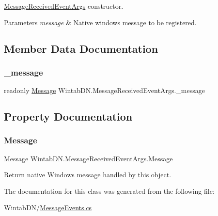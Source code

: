 \mbox{\hyperlink{class_wintab_d_n_1_1_message_received_event_args}{Message\+Received\+Event\+Args}} constructor. 


\begin{DoxyParams}{Parameters}
{\em message} & Native windows message to be registered.\\
\hline
\end{DoxyParams}


\subsection{Member Data Documentation}
\mbox{\label{class_wintab_d_n_1_1_message_received_event_args_a2cc2a78940d81ea30f41a3001f704d65}} 
\subsubsection{\texorpdfstring{\+\_\+message}{\_message}}
{\footnotesize\ttfamily readonly \mbox{\hyperlink{class_wintab_d_n_1_1_message_received_event_args_adec3e5d29618d27908ca87ed59805b44}{Message}} Wintab\+D\+N.\+Message\+Received\+Event\+Args.\+\_\+message\hspace{0.3cm}{\ttfamily [private]}}



\subsection{Property Documentation}
\mbox{\label{class_wintab_d_n_1_1_message_received_event_args_adec3e5d29618d27908ca87ed59805b44}} 
\subsubsection{\texorpdfstring{Message}{Message}}
{\footnotesize\ttfamily Message Wintab\+D\+N.\+Message\+Received\+Event\+Args.\+Message\hspace{0.3cm}{\ttfamily [get]}}



Return native Windows message handled by this object. 



The documentation for this class was generated from the following file\+:\begin{DoxyCompactItemize}
\item 
Wintab\+D\+N/\mbox{\hyperlink{_message_events_8cs}{Message\+Events.\+cs}}\end{DoxyCompactItemize}
